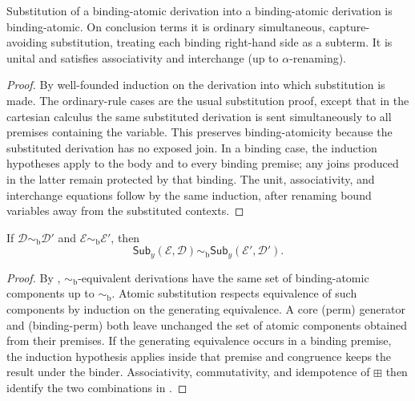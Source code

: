 \begin{lemma}
\label{lemma:letrec_atomic_substitution}
Substitution of a binding-atomic derivation into a binding-atomic derivation
is binding-atomic.  On conclusion terms it is ordinary simultaneous,
capture-avoiding substitution, treating each binding right-hand side as a
subterm.  It is unital and satisfies associativity and interchange (up to
$\alpha$-renaming).
\end{lemma}
\begin{proof}
By well-founded induction on the derivation into which substitution is made.
The ordinary-rule cases are the usual substitution proof, except that in the
cartesian calculus the same substituted derivation is sent simultaneously to
all premises containing the variable.  This preserves binding-atomicity
because the substituted derivation has no exposed join.  In a binding case,
the induction hypotheses apply to the body and to every binding premise; any
joins produced in the latter remain protected by that binding.  The unit,
associativity, and interchange equations follow by the same induction, after
renaming bound variables away from the substituted contexts.
\end{proof}

\begin{lemma}
\label{lemma:letrec_subst_respects_perm}
If $\mathcal D\sim_{\mathrm b}\mathcal D'$ and
$\mathcal E\sim_{\mathrm b}\mathcal E'$, then
\[
\mathsf{Sub}_y(\mathcal E,\mathcal D)
\sim_{\mathrm b}
\mathsf{Sub}_y(\mathcal E',\mathcal D').
\]
\end{lemma}
\begin{proof}
By , $\sim_{\mathrm b}$-equivalent
derivations have the same set of binding-atomic components up to
$\sim_{\mathrm b}$.  Atomic substitution respects equivalence of such
components by induction on the generating equivalence.  A core (perm)
generator and (binding-perm) both leave unchanged the set of atomic
components obtained from their premises.  If the generating equivalence occurs in a
binding premise, the induction hypothesis applies inside that premise and
congruence keeps the result under the binder.  Associativity, commutativity,
and idempotence of $\boxplus$ then identify the two combinations in
.
\end{proof}


